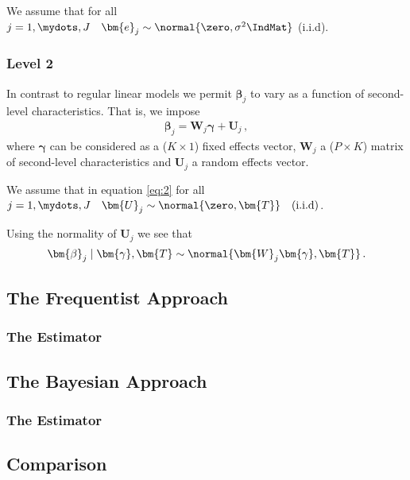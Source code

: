 \begin{assumption}
  We assume that for all $j=1,\mydots,J \quad \bm{e}_j \sim \normal{\zero, \sigma^2 \IndMat}$ (i.i.d).
\end{assumption}

\subsubsection*{Level 2}
In contrast to regular linear models we permit $\bm{\beta}_j$ to vary as a function of second-level characteristics.
That is, we impose
\begin{align} \label{eq:2}
  \bm{\beta}_j = \bm{W}_j \bm{\gamma} + \bm{U}_j \,,
\end{align}
where $\bm{\gamma}$ can be considered as a ($K \times 1$) fixed effects vector, $\bm{W}_j$ a ($P \times K$) matrix of second-level characteristics and $\bm{U}_j$ a random effects vector.

\begin{assumption}
  We assume that in equation \ref{eq:2} for all $j=1,\mydots,J \quad \bm{U}_j \sim \normal{\zero, \bm{T}} \quad \text{(i.i.d)}$.
\end{assumption}

\begin{remark}
  Using the normality of $\bm{U}_j$ we see that
  $$ \bm{\beta}_j \mid \bm{\gamma}, \bm{T} \sim \normal{\bm{W}_j \bm{\gamma}, \bm{T}} \,.$$
\end{remark}

\newpage
\subsection{The Frequentist Approach}
\subsubsection{The Estimator}
\subsection{The Bayesian Approach}
\subsubsection{The Estimator}
\subsection{Comparison}

